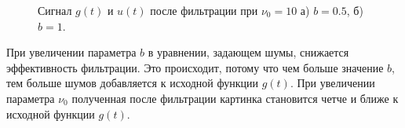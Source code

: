 \documentclass[a5paper, 10pt]{article}
\theoremstyle{definition}
\theoremstyle{plain}
\theoremstyle{remark}
\begin{document}
\begin{figure}[h!]
\begin{minipage}[h]{0.5\linewidth}
\end{minipage}
\hfill
\begin{minipage}[h]{0.5\linewidth}
\end{minipage}
\caption{Сигнал $g(t)$ и $u(t)$ после фильтрации при $\nu_0 = 10$ а) $b=0.5$, б) $b=1$.}
\end{figure}

\newpage
 При увеличении параметра $b$ в уравнении, задающем шумы, снижается эффективность фильтрации. Это происходит, потому что чем больше значение $b$, тем больше шумов добавляется к исходной функции $g(t)$. При увеличении параметра $\nu_0$ полученная после фильтрации картинка становится четче и ближе к исходной функции $g(t)$.
\end{document}
